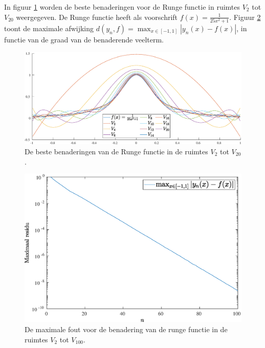 \documentclass[a4paper, 12pt, titlepage, fleqn]{article}
\begin{document}
In figuur \ref{fig:rungeFunctie} worden de beste benaderingen voor de Runge functie in ruimtes $V_2$ tot $V_{20}$ weergegeven. De Runge functie heeft als voorschrift $f(x) = \frac{1}{25x^2+1}$. Figuur \ref{fig:rungeFout} toont de maximale afwijking $d(y_n,f) = \max_{x \in [-1,1]}|y_n(x)-f(x)|$, in functie van de graad van de benaderende veelterm. 
\begin{figure}
\centering
\includegraphics[scale=0.5]{../Afbeeldingen/rungeBenadering.eps}
\caption{De beste benaderingen van de Runge functie in de ruimtes $V_2$ tot $V_{20}$.
\label{fig:rungeFunctie}}
\end{figure}

\begin{figure}
\centering
\includegraphics[scale=0.5]{../Afbeeldingen/rungeFout.eps}
\caption{De maximale fout voor de benadering van de runge functie in de ruimtes $V_2$ tot $V_{100}$.
\label{fig:rungeFout}}
\end{figure}
\end{document}
